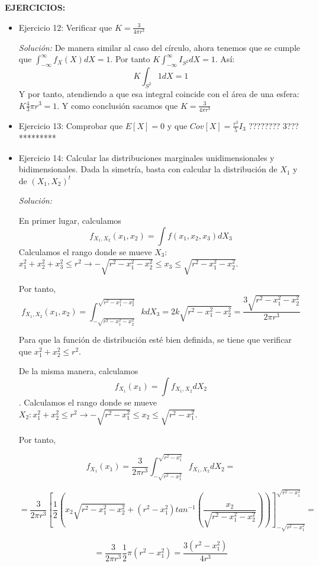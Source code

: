 \documentclass{article}
\theoremstyle{theorem-style}  %
\theoremstyle{definition}
\theoremstyle{example-style}
\begin{document}
	\textbf{EJERCICIOS:}
	\begin{itemize}
		\item Ejercicio 12: Verificar que $K=\frac{3}{4\pi r^3}$
		
		\textit{Solución:} De manera similar al caso del círculo, ahora tenemos que se cumple que $\int_{-\infty}^{\infty} f_X(X) dX = 1$. Por tanto $K \int_{-\infty}^{\infty} I_{S^2} dX =1 $. Así: $$K \int_{S^2}^{}1dX = 1 $$ Y por tanto, atendiendo a que esa integral coincide con el área de una esfera: $K\frac{4}{3}\pi r^3 = 1$. Y como conclusión sacamos que $K=\frac{3}{4\pi r^3}$
		
		\item Ejercicio 13: Comprobar que $E[X]=0$ y que $Cov[X] = \frac{r^2}{5}I_3$ ???????? 3???*********
		
		\item Ejercicio 14: Calcular las distribuciones marginales unidimensionales y bidimensionales. Dada la simetría, basta con calcular la distribución de $X_1$ y de $(X_1, X_2)^t$
		
		\textit{Solución:}
	
		
		En primer lugar, calculamos \[f_{X_1, X_2}(x_1, x_2) = \int f(x_1, x_2, x_3) dX_3\] Calculamos el rango donde se mueve $X_3$: $x_1^2 + x_2 ^2 + x_3 ^2 \leq r^2 \rightarrow - \sqrt{r^2 - x_1^2 - x_2^2} \leq x_3 \leq \sqrt{r^2 - x_1^2 - x_2^2}$.
		
		Por tanto, \[f_{X_1, X_2}(x_1, x_2) = \int_{-\sqrt{r^2-x_1^2-x_2^2}}^{\sqrt{r^2 - x_1^2 - x_2^2}} k dX_3 = 2 k \sqrt{r^2 - x_1^2 - x_2^2} = \frac{3 \sqrt{r^2 - x_1^2 - x_2^2}}{2 \pi r^3}\]
		
		Para que la función de distribución esté bien definida, se tiene que verificar que $x_1 ^2 + x_2^2 \leq r^2$. 
		

		De la misma manera, calculamos \[f_{X_1}(x_1) = \int f_{X_1, X_2} dX_2\]. Calculamos el rango donde se mueve $X_2: x_1^2 + x_2^2 \leq r^2 \rightarrow - \sqrt{r^2 - x_1^2} \leq x_2 \leq  \sqrt{r^2 - x_1^2}$.
		
		Por tanto,
		
		\[
		f_{X_1}(x_1) = \frac{3}{2 \pi r^3} \int_{- \sqrt{r^2 - x_1^2} }^{\sqrt{r^2 - x_1^2}} f_{X_1, X_2} dX_2 =
		\]
		
		\[  = \frac{3}{2 \pi r^3} \left[\frac{1}{2} \left( x_2 \sqrt{ r^2 - x_1^2 - x_2 ^2 } + (r^2 - x_1 ^2) tan ^{-1} \left( \frac{x_2}{\sqrt{r^2 - x_1 ^2 - x_2^2}}\right)   \right) \right]_{- \sqrt{r^2 - x_1^2} } ^{\sqrt{r^2 - x_1^2}} =
		\]
		
		\[
		=\frac{3}{2 \pi r^3} \frac{1}{2} \pi (r^2 - x_1^2) =  \frac{3 (r^2 - x_1^2)}{4 r^3}
		\] 
		

\end{itemize}
\end{document}
